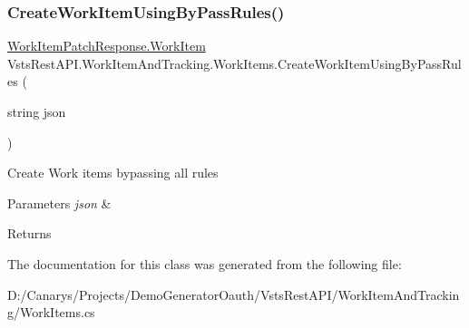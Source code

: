 \subsubsection{\texorpdfstring{Create\+Work\+Item\+Using\+By\+Pass\+Rules()}{CreateWorkItemUsingByPassRules()}}
{\footnotesize\ttfamily \mbox{\hyperlink{class_vsts_rest_a_p_i_1_1_viewmodel_1_1_work_item_1_1_work_item_patch_response_1_1_work_item}{Work\+Item\+Patch\+Response.\+Work\+Item}} Vsts\+Rest\+A\+P\+I.\+Work\+Item\+And\+Tracking.\+Work\+Items.\+Create\+Work\+Item\+Using\+By\+Pass\+Rules (\begin{DoxyParamCaption}\item[{string}]{json }\end{DoxyParamCaption})}



Create Work items bypassing all rules 


\begin{DoxyParams}{Parameters}
{\em json} & \\
\hline
\end{DoxyParams}
\begin{DoxyReturn}{Returns}

\end{DoxyReturn}


The documentation for this class was generated from the following file\+:\begin{DoxyCompactItemize}
\item 
D\+:/\+Canarys/\+Projects/\+Demo\+Generator\+Oauth/\+Vsts\+Rest\+A\+P\+I/\+Work\+Item\+And\+Tracking/Work\+Items.\+cs\end{DoxyCompactItemize}
